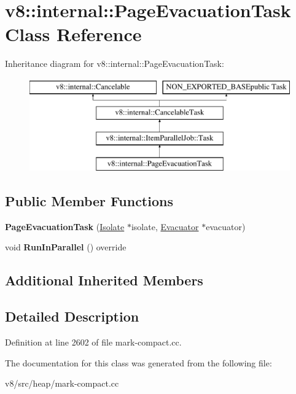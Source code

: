 \hypertarget{classv8_1_1internal_1_1PageEvacuationTask}{}\section{v8\+:\+:internal\+:\+:Page\+Evacuation\+Task Class Reference}
\label{classv8_1_1internal_1_1PageEvacuationTask}
Inheritance diagram for v8\+:\+:internal\+:\+:Page\+Evacuation\+Task\+:\begin{figure}[H]
\begin{center}
\leavevmode
\includegraphics[height=4.000000cm]{classv8_1_1internal_1_1PageEvacuationTask}
\end{center}
\end{figure}
\subsection*{Public Member Functions}
\begin{DoxyCompactItemize}
\item 
\mbox{\label{classv8_1_1internal_1_1PageEvacuationTask_afa020db4716d75aa0bba36c0bf327526}} 
{\bfseries Page\+Evacuation\+Task} (\mbox{\hyperlink{classv8_1_1internal_1_1Isolate}{Isolate}} $\ast$isolate, \mbox{\hyperlink{classv8_1_1internal_1_1Evacuator}{Evacuator}} $\ast$evacuator)
\item 
\mbox{\label{classv8_1_1internal_1_1PageEvacuationTask_a1f4674b1babeef01e4abbd9d9ee3e029}} 
void {\bfseries Run\+In\+Parallel} () override
\end{DoxyCompactItemize}
\subsection*{Additional Inherited Members}


\subsection{Detailed Description}


Definition at line 2602 of file mark-\/compact.\+cc.



The documentation for this class was generated from the following file\+:\begin{DoxyCompactItemize}
\item 
v8/src/heap/mark-\/compact.\+cc\end{DoxyCompactItemize}
